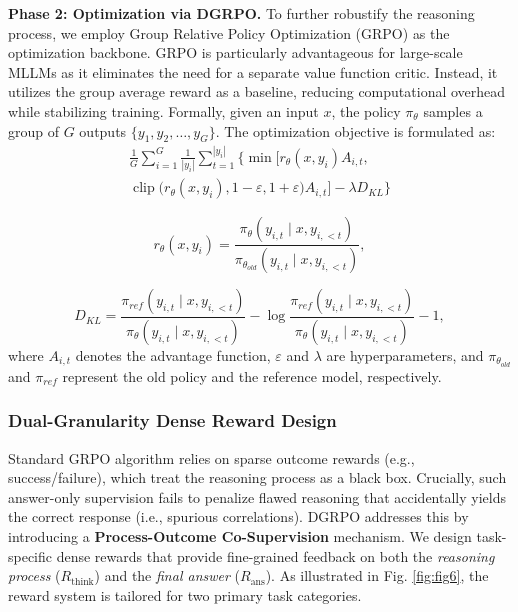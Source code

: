 \noindent\textbf{Phase 2: Optimization via DGRPO.}
To further robustify the reasoning process, we employ Group Relative Policy Optimization (GRPO) \cite{shao2024deepseekmath} as the optimization backbone. GRPO is particularly advantageous for large-scale MLLMs as it eliminates the need for a separate value function critic. Instead, it utilizes the group average reward as a baseline, reducing computational overhead while stabilizing training.
Formally, given an input $x$, the policy $\pi_{\theta}$ samples a group of $G$ outputs $\{y_1, y_2, \dots, y_G\}$. The optimization objective is formulated as:
\begin{equation}
\begin{split}
\frac{1}{G} \sum_{i=1}^{G} \frac{1}{\left| y_{i} \right|} \sum_{t=1}^{\left| y_{i} \right|}
\Big\{
\min \Big[
  r_{\theta}\left(x, y_{i}\right) A_{i,t},
  \\
  \operatorname{clip}\big( r_{\theta}\left(x, y_{i}\right), 
  1-\varepsilon, 1+\varepsilon \big) A_{i,t}
\Big] - \lambda D_{KL}
\Big\}
\end{split}
\end{equation}

\begin{equation}
r_{\theta }\left ( x, y_{i}  \right ) = \frac{\pi _{\theta } \left ( y_{i,t} \mid x,y_{i,<t}  \right )  }{\pi _{\theta_{old}} \left ( y_{i,t} \mid x,y_{i,<t}  \right ) } , 
\end{equation}

\begin{equation}
D_{KL} = \frac{\pi _{ref } \left ( y_{i,t} \mid x,y_{i,<t}  \right )  }{\pi _{\theta} \left ( y_{i,t} \mid x,y_{i,<t}  \right ) } - \log\frac{\pi _{ref } \left ( y_{i,t} \mid x,y_{i,<t}  \right )  }{\pi _{\theta} \left ( y_{i,t} \mid x,y_{i,<t}  \right ) }  -1,
\end{equation}
where \( A_{i,t} \) denotes the advantage function, \( \varepsilon \) and \( \lambda  \) are hyperparameters, and \( \pi_{\theta_{old}} \) and \( \pi_{ref} \) represent the old policy and the reference model, respectively. 

\subsubsection{Dual-Granularity Dense Reward Design}
Standard GRPO algorithm relies on sparse outcome rewards (e.g., success/failure), which treat the reasoning process as a black box. Crucially, such answer-only supervision fails to penalize flawed reasoning that accidentally yields the correct response (i.e., spurious correlations). DGRPO addresses this by introducing a \textbf{Process-Outcome Co-Supervision} mechanism. We design task-specific dense rewards that provide fine-grained feedback on both the \textit{reasoning process} ($R_{\text{think}}$) and the \textit{final answer} ($R_{\text{ans}}$). As illustrated in Fig. \ref{fig:fig6}, the reward system is tailored for two primary task categories.


